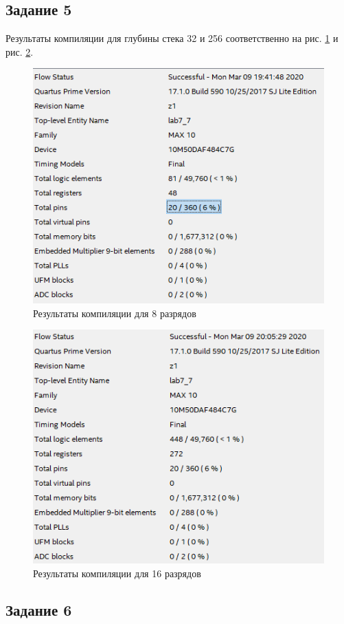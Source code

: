 \documentclass[a4paper,14pt]{article}
\begin{document}
	\subsection{Задание 5}
	
	Результаты компиляции для глубины стека 32 и 256 соответственно на рис. \ref{fig:z5_res_32} и рис. \ref{fig:z5_res_256}.
		
	\begin{figure}[H]
		\centering
		\includegraphics[width=0.7\linewidth]{images/z5_res_32}
		\caption{Результаты компиляции для 8 разрядов}
		\label{fig:z5_res_32}
	\end{figure}
	
	\begin{figure}[H]
		\centering
		\includegraphics[width=0.7\linewidth]{images/z5_res_256}
		\caption{Результаты компиляции для 16 разрядов}
		\label{fig:z5_res_256}
	\end{figure}
	
	\subsection{Задание 6}
	
\end{document}
